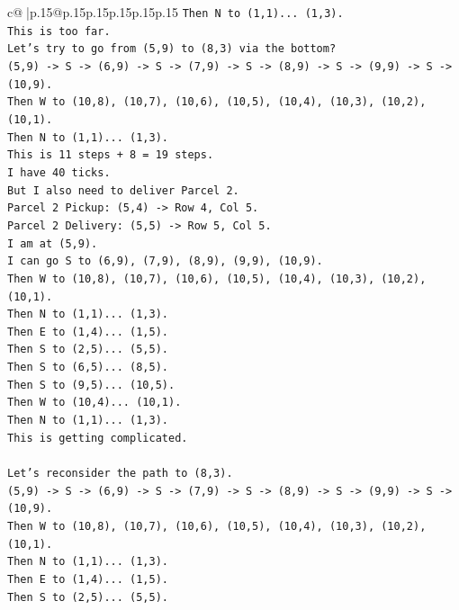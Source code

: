 \documentclass{article}
\begin{document}
{\begin{supertabular}{c@{$\;$}|p{.15\linewidth}@{}p{.15\linewidth}p{.15\linewidth}p{.15\linewidth}p{.15\linewidth}p{.15\linewidth}}
{{{\texttt{Then N to (1,1)... (1,3).} \\
\texttt{This is too far.} \\
\texttt{Let's try to go from (5,9) to (8,3) via the bottom?} \\
\texttt{(5,9) {-}> S {-}> (6,9) {-}> S {-}> (7,9) {-}> S {-}> (8,9) {-}> S {-}> (9,9) {-}> S {-}> (10,9).} \\
\texttt{Then W to (10,8), (10,7), (10,6), (10,5), (10,4), (10,3), (10,2), (10,1).} \\
\texttt{Then N to (1,1)... (1,3).} \\
\texttt{This is 11 steps + 8 = 19 steps.} \\
\texttt{I have 40 ticks.} \\
\texttt{But I also need to deliver Parcel 2.} \\
\texttt{Parcel 2 Pickup: (5,4) {-}> Row 4, Col 5.} \\
\texttt{Parcel 2 Delivery: (5,5) {-}> Row 5, Col 5.} \\
\texttt{I am at (5,9).} \\
\texttt{I can go S to (6,9), (7,9), (8,9), (9,9), (10,9).} \\
\texttt{Then W to (10,8), (10,7), (10,6), (10,5), (10,4), (10,3), (10,2), (10,1).} \\
\texttt{Then N to (1,1)... (1,3).} \\
\texttt{Then E to (1,4)... (1,5).} \\
\texttt{Then S to (2,5)... (5,5).} \\
\texttt{Then S to (6,5)... (8,5).} \\
\texttt{Then S to (9,5)... (10,5).} \\
\texttt{Then W to (10,4)... (10,1).} \\
\texttt{Then N to (1,1)... (1,3).} \\
\texttt{This is getting complicated.} \\
\\ 
\texttt{Let's reconsider the path to (8,3).} \\
\texttt{(5,9) {-}> S {-}> (6,9) {-}> S {-}> (7,9) {-}> S {-}> (8,9) {-}> S {-}> (9,9) {-}> S {-}> (10,9).} \\
\texttt{Then W to (10,8), (10,7), (10,6), (10,5), (10,4), (10,3), (10,2), (10,1).} \\
\texttt{Then N to (1,1)... (1,3).} \\
\texttt{Then E to (1,4)... (1,5).} \\
\texttt{Then S to (2,5)... (5,5).} \\
}}}
\end{supertabular}}
\end{document}

